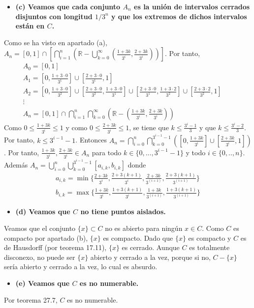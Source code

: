 \documentclass{article}
\begin{document}
\begin{itemize}
\item \bf (c) \rm Veamos que cada conjunto $A_n$ es la unión de intervalos cerrados disjuntos con longitud $1/3^n$ y que los extremos de dichos intervalos están en $C$.
\end{itemize}
Como se ha visto en apartado (a), $A_n=[0,1]\cap\left[\bigcap_{i=1}^n\left(\mathbb{R}-\bigcup_{k=0}^\infty\left(\frac{1+3k}{3^i},\frac{2+3k}{3^i}\right)\right)\right]$. Por tanto,
\begin{eqnarray}
A_0=[0,1]\nonumber\\
A_1=[0,\frac{1+3\cdot 0}{3^1}]\cup [\frac{2+3\cdot 0}{3^1},1]\nonumber\\
A_2=[0,\frac{1+3\cdot 0}{3^2}]\cup[\frac{2+3\cdot 0}{3^2},\frac{1+3\cdot 0}{3^1}]\cup [\frac{2+3\cdot 0}{3^1},\frac{1+3\cdot 2}{3^2}]\cup[\frac{2+3\cdot 2}{3^2},1]&&\nonumber\\
\vdots&&\nonumber\\
A_n=[0,1]\cap\bigcap_{i=1}^n\bigcap_{k=0}^\infty\left(\mathbb{R}-\left(\frac{1+3k}{3^i},\frac{2+3k}{3^i}\right)\right)&&\nonumber
\end{eqnarray}
Como $0\leq\frac{1+3k}{3^i}\leq 1$ y como $0\leq\frac{2+3k}{3^i}\leq 1$, se tiene que $k \leq \frac{3^i-1}{3}$ y que $k \leq \frac{3^i-2}{3}$. Por tanto, $k \leq 3^{i-1}-1$. Entonces
$A_n=\bigcap_{i=0}^n\bigcap_{k=0}^{3^{i-1}-1}\left(\left[0,\frac{1+3k}{3^i}\right]\cup\left[\frac{2+3k}{3^i},1\right]\right)$.
Por tanto, $\frac{1+3k}{3^i},\frac{2+3k}{3^i}\in A_n$ para todo $k\in \{0,...,3^{i-1}-1\}$ y todo $i\in \{0,..,n\}$. Además $A_n=\bigcup_{i=0}^n\bigcup_{k=0}^{3^{i-1}-1}\left[a_{i,k},b_{i,k}\right]$
donde
\begin{eqnarray}
a_{i,k}=\min\{\frac{2+3k}{3^i},\frac{2+3(k+1)}{3^i},\frac{2+3k}{3^{(i+1)}},\frac{2+3(k+1)}{3^{(i+1)}}\}\nonumber\\
b_{i,k}=\max\{\frac{1+3k}{3^i},\frac{1+3(k+1)}{3^i},\frac{1+3k}{3^{(i+1)}},\frac{1+3(k+1)}{3^{(i+1)}}\}\nonumber
\end{eqnarray}
\begin{itemize}
\item \bf (d) \rm Veamos que $C$ no tiene puntos aislados.
\end{itemize}
Veamos que el conjunto $\{x\}\subset C$ no es abierto para ningún $x\in C$. Como $C$ es compacto por apartado (b), $\{x\}$ es compacto. Dado que $\{x\}$ es compacto y $C$ es de Hausdorff (por teorema 17.11), $\{x\}$ es cerrado. Aunque $C$ es totalmente disconexo, no puede ser $\{x\}$ abierto y cerrado a la vez, porque si no, $C-\{x\}$ sería abierto y cerrado a la vez, lo cual es absurdo.
\begin{itemize}
\item \bf (e) \rm Veamos que $C$ es no numerable.
\end{itemize}
Por teorema 27.7, $C$ es no numerable.
\end{document}
